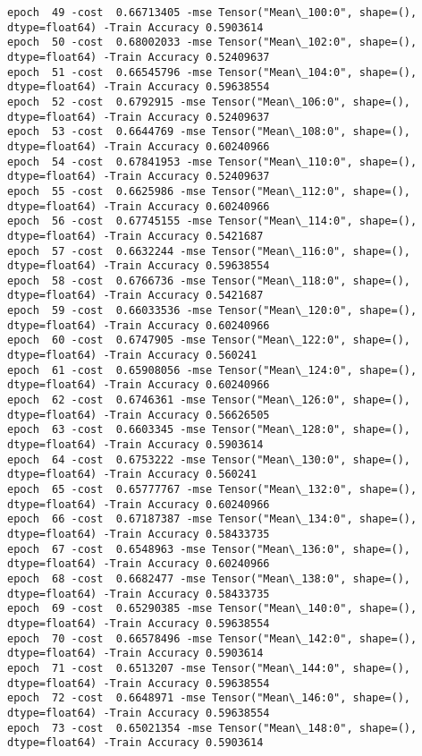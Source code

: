 \documentclass[11pt]{article}
\begin{document}
\begin{Verbatim}[commandchars=\\\{\}]
epoch  49 -cost  0.66713405 -mse Tensor("Mean\_100:0", shape=(), dtype=float64) -Train Accuracy 0.5903614
epoch  50 -cost  0.68002033 -mse Tensor("Mean\_102:0", shape=(), dtype=float64) -Train Accuracy 0.52409637
epoch  51 -cost  0.66545796 -mse Tensor("Mean\_104:0", shape=(), dtype=float64) -Train Accuracy 0.59638554
epoch  52 -cost  0.6792915 -mse Tensor("Mean\_106:0", shape=(), dtype=float64) -Train Accuracy 0.52409637
epoch  53 -cost  0.6644769 -mse Tensor("Mean\_108:0", shape=(), dtype=float64) -Train Accuracy 0.60240966
epoch  54 -cost  0.67841953 -mse Tensor("Mean\_110:0", shape=(), dtype=float64) -Train Accuracy 0.52409637
epoch  55 -cost  0.6625986 -mse Tensor("Mean\_112:0", shape=(), dtype=float64) -Train Accuracy 0.60240966
epoch  56 -cost  0.67745155 -mse Tensor("Mean\_114:0", shape=(), dtype=float64) -Train Accuracy 0.5421687
epoch  57 -cost  0.6632244 -mse Tensor("Mean\_116:0", shape=(), dtype=float64) -Train Accuracy 0.59638554
epoch  58 -cost  0.6766736 -mse Tensor("Mean\_118:0", shape=(), dtype=float64) -Train Accuracy 0.5421687
epoch  59 -cost  0.66033536 -mse Tensor("Mean\_120:0", shape=(), dtype=float64) -Train Accuracy 0.60240966
epoch  60 -cost  0.6747905 -mse Tensor("Mean\_122:0", shape=(), dtype=float64) -Train Accuracy 0.560241
epoch  61 -cost  0.65908056 -mse Tensor("Mean\_124:0", shape=(), dtype=float64) -Train Accuracy 0.60240966
epoch  62 -cost  0.6746361 -mse Tensor("Mean\_126:0", shape=(), dtype=float64) -Train Accuracy 0.56626505
epoch  63 -cost  0.6603345 -mse Tensor("Mean\_128:0", shape=(), dtype=float64) -Train Accuracy 0.5903614
epoch  64 -cost  0.6753222 -mse Tensor("Mean\_130:0", shape=(), dtype=float64) -Train Accuracy 0.560241
epoch  65 -cost  0.65777767 -mse Tensor("Mean\_132:0", shape=(), dtype=float64) -Train Accuracy 0.60240966
epoch  66 -cost  0.67187387 -mse Tensor("Mean\_134:0", shape=(), dtype=float64) -Train Accuracy 0.58433735
epoch  67 -cost  0.6548963 -mse Tensor("Mean\_136:0", shape=(), dtype=float64) -Train Accuracy 0.60240966
epoch  68 -cost  0.6682477 -mse Tensor("Mean\_138:0", shape=(), dtype=float64) -Train Accuracy 0.58433735
epoch  69 -cost  0.65290385 -mse Tensor("Mean\_140:0", shape=(), dtype=float64) -Train Accuracy 0.59638554
epoch  70 -cost  0.66578496 -mse Tensor("Mean\_142:0", shape=(), dtype=float64) -Train Accuracy 0.5903614
epoch  71 -cost  0.6513207 -mse Tensor("Mean\_144:0", shape=(), dtype=float64) -Train Accuracy 0.59638554
epoch  72 -cost  0.6648971 -mse Tensor("Mean\_146:0", shape=(), dtype=float64) -Train Accuracy 0.59638554
epoch  73 -cost  0.65021354 -mse Tensor("Mean\_148:0", shape=(), dtype=float64) -Train Accuracy 0.5903614

\end{Verbatim}
\end{document}
